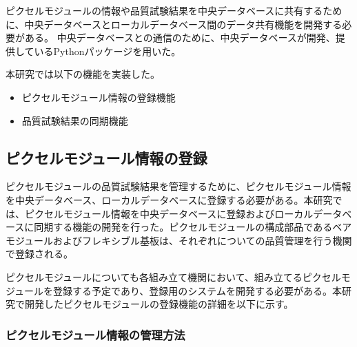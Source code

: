 ピクセルモジュールの情報や品質試験結果を中央データベースに共有するために、中央データベースとローカルデータベース間のデータ共有機能を開発する必要がある。
中央データベースとの通信のために、中央データベースが開発、提供しているPythonパッケージを用いた。



本研究では以下の機能を実装した。
\begin{itemize}
  \item ピクセルモジュール情報の登録機能
  \item 品質試験結果の同期機能
\end{itemize}


\subsection{ピクセルモジュール情報の登録}
\label{sec:register-module}

ピクセルモジュールの品質試験結果を管理するために、ピクセルモジュール情報を中央データベース、ローカルデータベースに登録する必要がある。本研究では、ピクセルモジュール情報を中央データベースに登録およびローカルデータベースに同期する機能の開発を行った。ピクセルモジュールの構成部品であるベアモジュールおよびフレキシブル基板は、それぞれについての品質管理を行う機関で登録される。

ピクセルモジュールについても各組み立て機関において、組み立てるピクセルモジュールを登録する予定であり、登録用のシステムを開発する必要がある。本研究で開発したピクセルモジュールの登録機能の詳細を以下に示す。


\subsubsection{ピクセルモジュール情報の管理方法}
\label{sec:module-parentchild}

